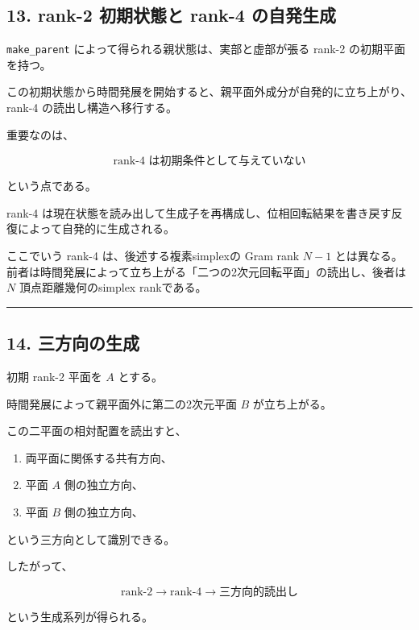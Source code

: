 \documentclass[
  a4paper,
]{ltjsarticle}
\providecommand{\tightlist}{%
  \setlength{\itemsep}{0pt}\setlength{\parskip}{0pt}}
\begin{document}
\subsection{13. rank-2 初期状態と rank-4
の自発生成}\label{rank-2-ux521dux671fux72b6ux614bux3068-rank-4-ux306eux81eaux767aux751fux6210}

\texttt{make\_parent} によって得られる親状態は、実部と虚部が張る rank-2
の初期平面を持つ。

この初期状態から時間発展を開始すると、親平面外成分が自発的に立ち上がり、rank-4
の読出し構造へ移行する。

重要なのは、

\[
\boxed{
\text{rank-4 は初期条件として与えていない}
}
\]

という点である。

rank-4
は現在状態を読み出して生成子を再構成し、位相回転結果を書き戻す反復によって自発的に生成される。

ここでいう rank-4 は、後述する複素simplexの Gram rank \(N-1\)
とは異なる。前者は時間発展によって立ち上がる「二つの2次元回転平面」の読出し、後者は
\(N\) 頂点距離幾何のsimplex rankである。

\begin{center}\rule{0.5\linewidth}{0.5pt}\end{center}

\subsection{14.
三方向の生成}\label{ux4e09ux65b9ux5411ux306eux751fux6210}

初期 rank-2 平面を \(A\) とする。

時間発展によって親平面外に第二の2次元平面 \(B\) が立ち上がる。

この二平面の相対配置を読出すと、

\begin{enumerate}
\def\labelenumi{\arabic{enumi}.}
\tightlist
\item
  両平面に関係する共有方向、
\item
  平面 \(A\) 側の独立方向、
\item
  平面 \(B\) 側の独立方向、
\end{enumerate}

という三方向として識別できる。

したがって、

\[
\boxed{
\text{rank-2}
\rightarrow
\text{rank-4}
\rightarrow
\text{三方向的読出し}
}
\]

という生成系列が得られる。
\end{document}

